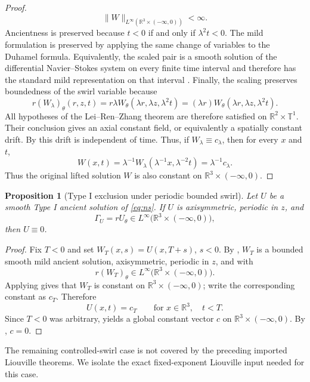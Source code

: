 \documentclass[11pt]{amsart}
\theoremstyle{plain}
\newtheorem{proposition}[theorem]{Proposition}
\theoremstyle{definition}
\theoremstyle{remark}
\numberwithin{equation}{section}
\begin{document}
\begin{proof}
\[   \|W\|_{L^\infty(\mathbb R^3\times(-\infty,0))}<\infty .
\]
Ancientness is preserved because \(t<0\) if and only if
\(\lambda^2t<0\).  The mild formulation is preserved by applying the same
change of variables to the Duhamel formula.  Equivalently, the scaled pair is a
smooth solution of the differential Navier--Stokes system on every finite time
interval and therefore has the standard mild representation on that interval
\cite{Kato1984,Sohr2001}.  Finally, the scaling preserves
boundedness of the swirl variable because
\[
   r(W_\lambda)_\theta(r,z,t)
   =
   r\lambda W_\theta(\lambda r,\lambda z,\lambda^2t)
   =
   (\lambda r)W_\theta(\lambda r,\lambda z,\lambda^2t).
\]
All hypotheses of the Lei--Ren--Zhang theorem are therefore satisfied on
\(\mathbb R^2\times\mathbb T^1\).  Their conclusion gives an axial constant
field, or equivalently a spatially constant drift.  By
 this drift is independent of time.  Thus, if
\(W_\lambda\equiv c_\lambda\), then for every \(x\) and \(t\),
\[
   W(x,t)=\lambda^{-1}W_\lambda(\lambda^{-1}x,\lambda^{-2}t)
   =\lambda^{-1}c_\lambda .
\]
Thus the original lifted solution \(W\) is also constant on
\(\mathbb R^3\times(-\infty,0)\).
\end{proof}

\begin{proposition}[Type I exclusion under periodic bounded swirl]
\label{prop:periodic-swirl-exclusion}
Let \(U\) be a smooth Type I ancient solution of \eqref{eq:ns}.  If \(U\) is
axisymmetric, periodic in \(z\), and
\[
   \Gamma_U=rU_\theta\in L^\infty\bigl(\mathbb R^3\times(-\infty,0)\bigr),
\]
then \(U\equiv0\).
\end{proposition}

\begin{proof}
Fix \(T<0\) and set \(W_T(x,s)=U(x,T+s)\), \(s<0\).  By
, \(W_T\) is a bounded smooth mild ancient solution,
axisymmetric, periodic in \(z\), and with
\[
   r(W_T)_\theta\in L^\infty
      \bigl(\mathbb R^3\times(-\infty,0)\bigr).
\]
Applying  gives that \(W_T\) is constant on
\(\mathbb R^3\times(-\infty,0)\); write the corresponding constant as
\(c_T\).  Therefore
\[
   U(x,t)=c_T\qquad\text{for }x\in\mathbb R^3,\quad t<T .
\]
Since \(T<0\) was arbitrary,
 yields a global constant vector \(c\) on
\(\mathbb R^3\times(-\infty,0)\).  By , \(c=0\).
\end{proof}

The remaining controlled-swirl case is not covered by the preceding imported
Liouville theorems.  We isolate the exact fixed-exponent Liouville input needed
for this case.
\end{document}
